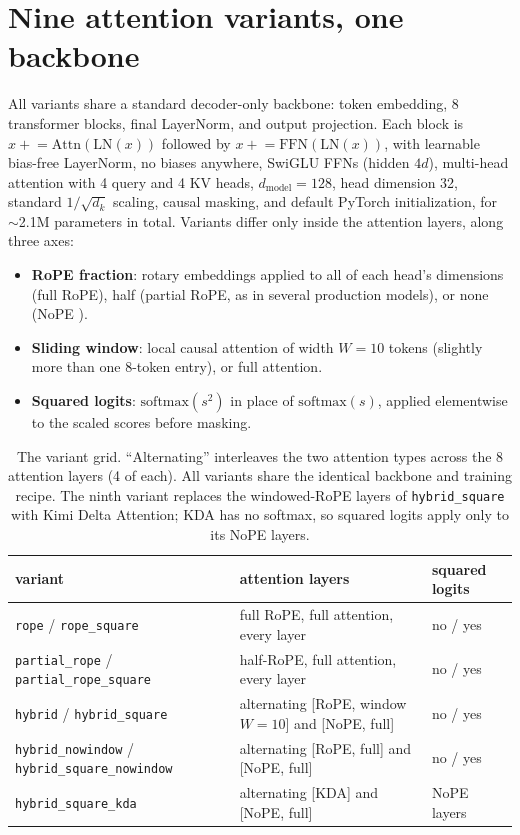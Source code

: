 \documentclass[10pt]{article}
\begin{document}
\section{Nine attention variants, one backbone}
\label{sec:variants}

All variants share a standard decoder-only backbone: token embedding,
8 transformer blocks, final LayerNorm, and output projection. Each block
is $x \mathrel{+}= \mathrm{Attn}(\mathrm{LN}(x))$ followed by
$x \mathrel{+}= \mathrm{FFN}(\mathrm{LN}(x))$, with learnable bias-free
LayerNorm, no biases anywhere, SwiGLU FFNs (hidden $4d$), multi-head
attention with 4 query and 4 KV heads, $d_{\text{model}}=128$, head
dimension 32, standard $1/\sqrt{d_k}$ scaling, causal masking, and default
PyTorch initialization, for $\sim$2.1M parameters in total. Variants differ only
inside the attention layers, along three axes:

\begin{itemize}
  \item \textbf{RoPE fraction}: rotary embeddings \citep{su2021roformer}
  applied to all of each head's dimensions (full RoPE), half (partial
  RoPE, as in several production models), or none (NoPE
  \citep{kazemnejad2023impact}).
  \item \textbf{Sliding window}: local causal attention of width $W=10$
  tokens (slightly more than one 8-token entry), or full attention.
  \item \textbf{Squared logits}: $\mathrm{softmax}(s^2)$ in place of
  $\mathrm{softmax}(s)$, applied elementwise to the scaled scores before
  masking.
\end{itemize}

\begin{table}[t]
\centering
\small
\begin{tabular}{lll}
\toprule
variant & attention layers & squared logits \\
\midrule
\texttt{rope} / \texttt{rope\_square} & full RoPE, full attention, every layer & no / yes \\
\texttt{partial\_rope} / \texttt{partial\_rope\_square} & half-RoPE, full attention, every layer & no / yes \\
\texttt{hybrid} / \texttt{hybrid\_square} & alternating [RoPE, window $W{=}10$] and [NoPE, full] & no / yes \\
\texttt{hybrid\_nowindow} / \texttt{hybrid\_square\_nowindow} & alternating [RoPE, full] and [NoPE, full] & no / yes \\
\texttt{hybrid\_square\_kda} & alternating [KDA] and [NoPE, full] & NoPE layers \\
\bottomrule
\end{tabular}
\caption{The variant grid. ``Alternating'' interleaves the two attention
types across the 8 attention layers (4 of each). All variants share the
identical backbone and training recipe. The ninth variant replaces the
windowed-RoPE layers of \texttt{hybrid\_square} with Kimi Delta
Attention; KDA has no softmax, so squared logits apply only to its NoPE
layers.}
\label{tab:variants}
\end{table}
\end{document}
